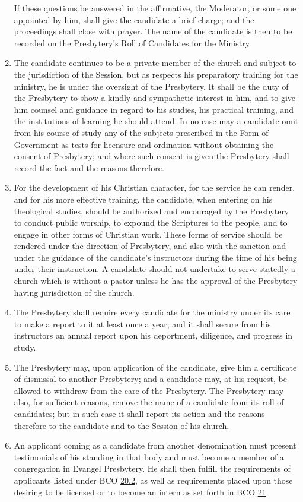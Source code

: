 \documentclass[
]{book}
\begin{document}
\begin{enumerate}
  If these questions be answered in the affirmative, the Moderator, or some one appointed by him, shall give the candidate a brief charge; and the proceedings shall close with prayer. The name of the candidate is then to be recorded on the Presbytery's Roll of Candidates for the Ministry.
\item
  The candidate continues to be a private member of the church and subject to the jurisdiction of the Session, but as respects his preparatory training for the ministry, he is under the oversight of the Presbytery. It shall be the duty of the Presbytery to show a kindly and sympathetic interest in him, and to give him counsel and guidance in regard to his studies, his practical training, and the institutions of learning he should attend. In no case may a candidate omit from his course of study any of the subjects prescribed in the Form of Government as tests for licensure and ordination without obtaining the consent of Presbytery; and where such consent is given the Presbytery shall record the fact and the reasons therefore.
\item
  For the development of his Christian character, for the service he can render, and for his more effective training, the candidate, when entering on his theological studies, should be authorized and encouraged by the Presbytery to conduct public worship, to expound the Scriptures to the people, and to engage in other forms of Christian work. These forms of service should be rendered under the direction of Presbytery, and also with the sanction and under the guidance of the candidate's instructors during the time of his being under their instruction. A candidate should not undertake to serve statedly a church which is without a pastor unless he has the approval of the Presbytery having jurisdiction of the church.
\item
  The Presbytery shall require every candidate for the ministry under its care to make a report to it at least once a year; and it shall secure from his instructors an annual report upon his deportment, diligence, and progress in study.
\item
  The Presbytery may, upon application of the candidate, give him a certificate of dismissal to another Presbytery; and a candidate may, at his request, be allowed to withdraw from the care of the Presbytery. The Presbytery may also, for sufficient reasons, remove the name of a candidate from its roll of candidates; but in such case it shall report its action and the reasons therefore to the candidate and to the Session of his church.
\item
  An applicant coming as a candidate from another denomination must present testimonials of his standing in that body and must become a member of a congregation in Evangel Presbytery. He shall then fulfill the requirements of applicants listed under BCO \protect\hyperlink{20.2}{20.2}, as well as requirements placed upon those desiring to be licensed or to become an intern as set forth in BCO \protect\hyperlink{21}{21}.
\end{enumerate}
\end{document}
